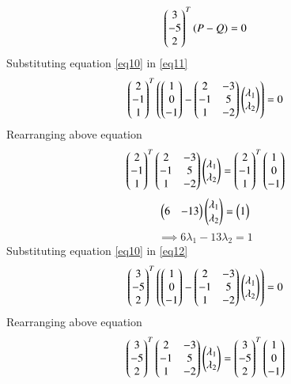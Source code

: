\documentclass[journal,12pt,twocolumn]{IEEEtran}
\begin{document}
\begin{equation}\label{eq12}
    \begin{pmatrix}3\\-5\\2\end{pmatrix}^T\left(P - Q\right) = 0
\end{equation}
Substituting equation \eqref{eq10} in \eqref{eq11}
\begin{equation}
    \begin{pmatrix}2\\-1\\1\end{pmatrix}^T\left(\begin{pmatrix}1\\0\\-1\end{pmatrix} - \begin{pmatrix}2 & -3\\-1 & 5\\1 & -2\end{pmatrix}\begin{pmatrix}\lambda{_1}\\\lambda{_2}\end{pmatrix}\right) = 0
\end{equation}
Rearranging above equation
\begin{equation}
    \begin{pmatrix}2\\-1\\1\end{pmatrix}^T\begin{pmatrix}2 & -3\\-1 & 5\\1 & -2\end{pmatrix}\begin{pmatrix}\lambda{_1}\\\lambda{_2}\end{pmatrix} = \begin{pmatrix}2\\-1\\1\end{pmatrix}^T\begin{pmatrix}1\\0\\-1\end{pmatrix}
\end{equation}
\begin{equation}
    \begin{pmatrix}6 & -13\end{pmatrix}\begin{pmatrix}\lambda{_1}\\\lambda{_2}\end{pmatrix} = \begin{pmatrix}1\end{pmatrix}
\end{equation}
\begin{equation}\label{eq3}
    \implies 6\lambda{_1} -13\lambda{_2} = 1
\end{equation}
Substituting equation \eqref{eq10} in \eqref{eq12}
\begin{equation}
    \begin{pmatrix}3\\-5\\2\end{pmatrix}^T\left(\begin{pmatrix}1\\0\\-1\end{pmatrix} - \begin{pmatrix}2 & -3\\-1 & 5\\1 & -2\end{pmatrix}\begin{pmatrix}\lambda{_1}\\\lambda{_2}\end{pmatrix}\right) = 0
\end{equation}
Rearranging above equation
\begin{equation}
    \begin{pmatrix}3\\-5\\2\end{pmatrix}^T\begin{pmatrix}2 & -3\\-1 & 5\\1 & -2\end{pmatrix}\begin{pmatrix}\lambda{_1}\\\lambda{_2}\end{pmatrix} = \begin{pmatrix}3\\-5\\2\end{pmatrix}^T\begin{pmatrix}1\\0\\-1\end{pmatrix}
\end{equation}
\end{document}

